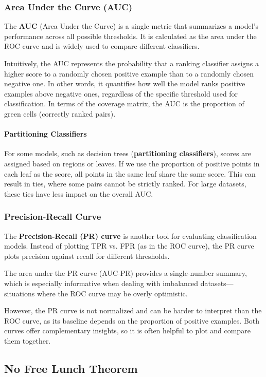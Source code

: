\subsubsection*{Area Under the Curve (AUC)}
The \textbf{AUC} (Area Under the Curve) is a single metric that summarizes a model's performance across all possible thresholds.
It is calculated as the area under the ROC curve and is widely used to compare different classifiers.

Intuitively, the AUC represents the probability that a ranking classifier assigns a higher score to a randomly chosen positive example than to a randomly chosen negative one.
In other words, it quantifies how well the model ranks positive examples above negative ones, regardless of the specific threshold used for classification.
In terms of the coverage matrix, the AUC is the proportion of green cells (correctly ranked pairs).

\paragraph{Partitioning Classifiers}
For some models, such as decision trees (\textbf{partitioning classifiers}), scores are assigned based on regions or leaves.
If we use the proportion of positive points in each leaf as the score, all points in the same leaf share the same score.
This can result in ties, where some pairs cannot be strictly ranked.
For large datasets, these ties have less impact on the overall AUC.

\subsubsection*{Precision-Recall Curve}
The \textbf{Precision-Recall (PR) curve} is another tool for evaluating classification models.
Instead of plotting TPR vs. FPR (as in the ROC curve), the PR curve plots precision against recall for different thresholds.

The area under the PR curve (AUC-PR) provides a single-number summary, which is especially informative when dealing with imbalanced datasets—situations where the ROC curve may be overly optimistic.

However, the PR curve is not normalized and can be harder to interpret than the ROC curve, as its baseline depends on the proportion of positive examples.
Both curves offer complementary insights, so it is often helpful to plot and compare them together.

\subsection{No Free Lunch Theorem}


